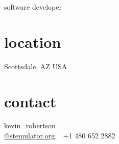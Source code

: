 \documentclass[]{cv}
\begin{document}
       {software developer}

\begin{aside}
    \section{location}
        Scottsdale, AZ
        USA
    \section{contact}
        \href{mailto:kevin\_robertson@stemulator.org}{kevin\_robertson\\@stemulator.org}
        ~
        +1 480 652 2882
\end{aside}





\end{document}
